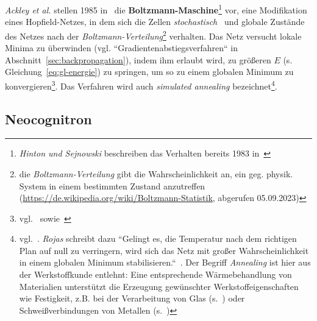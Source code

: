 \textit{Ackley et al.} stellen 1985 in~\cite{AHS85} die \textbf{Boltzmann-Maschine}\footnote{
    \textit{Hinton und Sejnowski} beschreiben das Verhalten bereits 1983 in~\cite{HS83}
} vor, eine Modifikation eines Hopfield-Netzes, in dem sich die Zellen \textit{stochastisch}~\cite[635]{AR88} und globale Zustände des Netzes nach der \textit{Boltzmann-Verteilung}\footnote{
    die \textit{Boltzmann-Verteilung} gibt die Wahrscheinlichkeit an, ein geg. physik. System in einem bestimmten Zustand anzutreffen (\url{https://de.wikipedia.org/wiki/Boltzmann-Statistik}, abgerufen  05.09.2023)
} verhalten. Das Netz versucht lokale Minima zu überwinden (vgl. ``Gradientenabstiegsverfahren`` in Abschnitt~\ref{sec:backpropagation}), indem ihm erlaubt wird, zu größeren $E$ (s. Gleichung~\ref{eq:gl-energie}) zu springen, um so zu einem globalen Minimum zu konvergieren\footnote{
    vgl.~\cite[151]{AHS85} sowie~\cite[107]{Koh90}
}.
Das Verfahren wird auch \textit{simulated annealing} bezeichnet\footnote{vgl.~\cite[297]{Ert21b}. \textit{Rojas} schreibt dazu
    ``Gelingt es, die Temperatur nach dem richtigen Plan auf null zu verringern, wird sich das Netz mit großer Wahrscheinlichkeit in einem globalen Minimum stabilisieren.``~\cite[322]{Roj93}. Der Begriff \textit{Annealing} ist hier aus der Werkstoffkunde entlehnt: Eine entsprechende Wärmebehandlung von Materialien unterstützt die Erzeugung gewünschter Werkstoffeigenschaften wie Festigkeit, z.B.  bei der Verarbeitung von Glas (s.~\cite[3]{Jeb11}) oder Schweißverbindungen von Metallen (s.~\cite{FJOA19})
}.

\subsection{Neocognitron}

